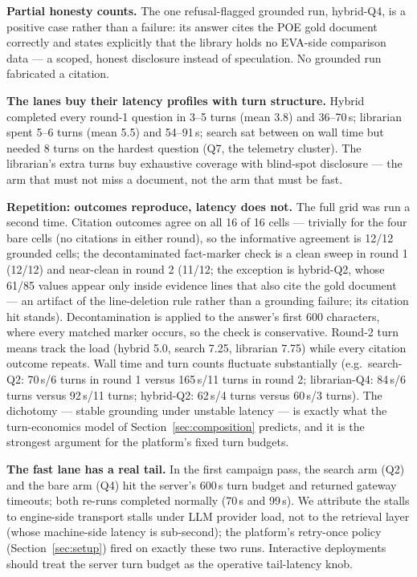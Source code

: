 \textbf{Partial honesty counts.} The one refusal-flagged grounded run,
hybrid-Q4, is a positive case rather than a failure: its answer cites the
POE gold document correctly and states explicitly that the library holds no
EVA-side comparison data --- a scoped, honest disclosure instead of
speculation. No grounded run fabricated a citation.

\textbf{The lanes buy their latency profiles with turn structure.} Hybrid
completed every round-1 question in 3--5 turns (mean 3.8) and 36--70\,s;
librarian
spent 5--6 turns (mean 5.5) and 54--91\,s; search sat between on wall time
but needed 8 turns on the hardest question (Q7, the telemetry cluster).
The librarian's extra turns buy exhaustive coverage with blind-spot
disclosure --- the arm that must not miss a document, not the arm that
must be fast.

\textbf{Repetition: outcomes reproduce, latency does not.} The full grid
was run a second time. Citation outcomes agree on all 16 of 16 cells ---
trivially for the four bare cells (no citations in either round), so the
informative agreement is 12/12 grounded cells; the decontaminated
fact-marker check is a clean sweep in round 1 (12/12) and near-clean in
round 2 (11/12; the exception is hybrid-Q2, whose 61/85 values appear only
inside evidence lines that also cite the gold document --- an artifact of
the line-deletion rule rather than a grounding failure; its citation hit
stands). Decontamination is applied to the answer's first 600 characters,
where every matched marker occurs, so the check is conservative. Round-2
turn means track the load (hybrid 5.0, search 7.25, librarian 7.75) while
every citation outcome repeats.
Wall time and turn counts fluctuate substantially
(e.g.\ search-Q2: 70\,s/6 turns in round 1 versus 165\,s/11 turns in
round 2; librarian-Q4: 84\,s/6 turns versus 92\,s/11 turns; hybrid-Q2:
62\,s/4 turns versus 60\,s/3 turns). The dichotomy --- stable grounding
under unstable latency --- is exactly what the turn-economics model of
Section~\ref{sec:composition} predicts, and it is the strongest argument
for the platform's fixed turn budgets.

\textbf{The fast lane has a real tail.} In the first campaign pass, the
search arm (Q2) and the bare arm (Q4) hit the server's 600\,s turn budget
and returned gateway timeouts; both re-runs completed normally (70\,s and
99\,s). We attribute the stalls to engine-side transport stalls under LLM
provider load, not to the retrieval layer (whose machine-side latency is
sub-second); the platform's retry-once policy (Section~\ref{sec:setup})
fired on exactly these two runs. Interactive deployments should treat the
server turn budget as the operative tail-latency knob.

